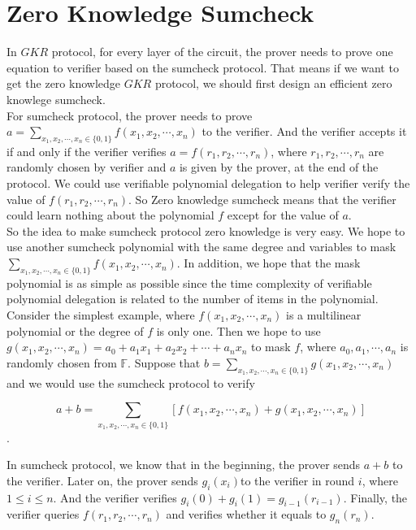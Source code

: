 \section{Zero Knowledge Sumcheck}

In $GKR$ protocol, for every layer of the circuit, the prover needs to prove one equation to verifier based on the sumcheck protocol. That means if we want to get the zero knowledge $GKR$ protocol, we should first design an efficient zero knowlege sumcheck.\\

\noindent
For sumcheck protocol, the prover needs to prove $a = \sum\limits_{x_1, x_2, \cdots, x_n \in \{0, 1\}}f(x_1, x_2, \cdots, x_n)$ to the verifier. And the verifier accepts it if and only if the verifier verifies $a = f(r_1, r_2, \cdots, r_n)$, where $r_1, r_2, \cdots, r_n$ are randomly chosen by verifier and $a$ is given by the prover, at the end of the protocol. We could use verifiable polynomial delegation to help verifier verify the value of $f(r_1, r_2, \cdots, r_n)$. So Zero knowledge sumcheck means that the verifier could learn nothing about the polynomial $f$ except for the value of $a$.\\

\noindent
So the idea to make sumcheck protocol zero knowledge is very easy. We hope to use another sumcheck polynomial with the same degree and variables to mask $\sum\limits_{x_1, x_2, \cdots, x_n \in \{0, 1\}}f(x_1, x_2, \cdots, x_n)$. In addition, we hope that the mask polynomial is as simple as possible since the time complexity of verifiable polynomial delegation is related to the number of items in the polynomial.\\

\noindent
Consider the simplest example, where $f(x_1, x_2, \cdots, x_n)$ is a multilinear polynomial or the degree of $f$ is only one. Then we hope to use $g(x_1, x_2, \cdots, x_n) = a_0 + a_1x_1 + a_2x_2 + \cdots + a_nx_n$ to mask $f$, where $a_0, a_1, \cdots, a_n$ is randomly chosen from $\mathbb{F}$. Suppose that $b = \sum\limits_{x_1, x_2, \cdots, x_n \in \{0, 1\}}g(x_1, x_2, \cdots, x_n)$ and we would use the sumcheck protocol to verify

$$a + b = \sum\limits_{x_1, x_2, \cdots, x_n \in \{0, 1\}}[f(x_1, x_2, \cdots, x_n) + g(x_1, x_2, \cdots, x_n)]$$. 

In sumcheck protocol, we know that in the beginning, the prover sends $a + b$ to the verifier. Later on, the prover sends $g_i(x_i)$to the verifier in round $i$, where $1 \leq i \leq n$. And the verifier verifies $g_i(0) + g_i(1) = g_{i-1}(r_{i-1})$. Finally, the verifier queries $f(r_1, r_2, \cdots, r_n)$ and verifies whether it equals to $g_n(r_n)$.\\

